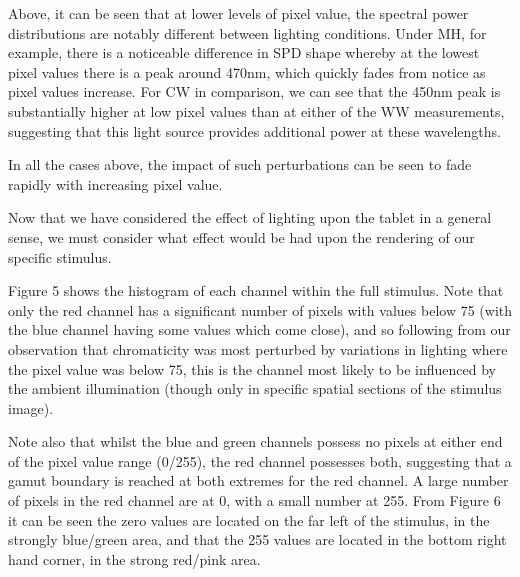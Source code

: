 
Above, it can be seen that at lower levels of pixel value, the spectral power distributions are notably different between lighting conditions. Under MH, for example, there is a noticeable difference in SPD shape whereby at the lowest pixel values there is a peak around 470nm, which quickly fades from notice as pixel values increase. For CW in comparison, we can see that the 450nm peak is substantially higher at low pixel values than at either of the WW measurements, suggesting that this light source provides additional power at these wavelengths.

In all the cases above, the impact of such perturbations can be seen to fade rapidly with increasing pixel value.

Now that we have considered the effect of lighting upon the tablet in a general sense, we must consider what effect would be had upon the rendering of our specific stimulus.


Figure 5 shows the histogram of each channel within the full stimulus. Note that only the red channel has a significant number of pixels with values below 75 (with the blue channel having some values which come close), and so following from our observation that chromaticity was most perturbed by variations in lighting where the pixel value was below 75, this is the channel most likely to be influenced by the ambient illumination (though only in specific spatial sections of the stimulus image).

Note also that whilst the blue and green channels possess no pixels at either end of the pixel value range (0/255), the red channel possesses both, suggesting that a gamut boundary is reached at both extremes for the red channel. A large number of pixels in the red channel are at 0, with a small number at 255. From Figure 6 it can be seen the zero values are located on the far left of the stimulus, in the strongly blue/green area, and that the 255 values are located in the bottom right hand corner, in the strong red/pink area.


